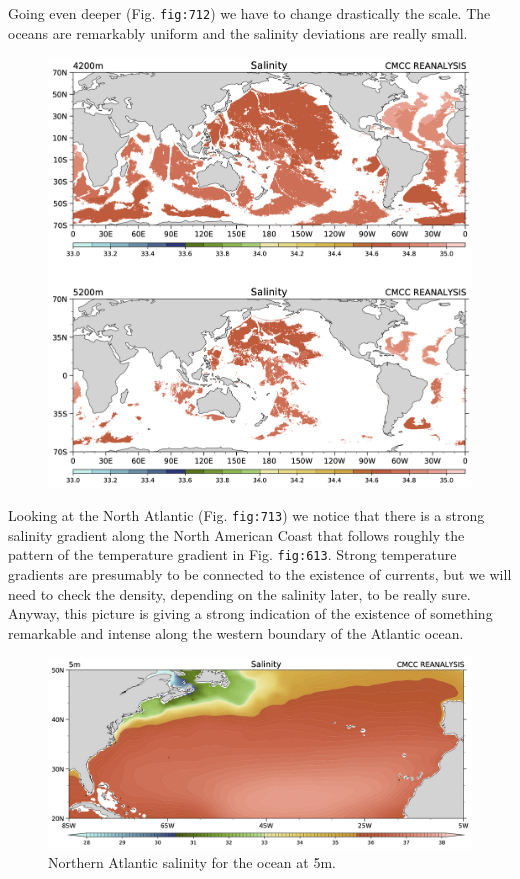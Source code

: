 Going even deeper (Fig. \texttt{fig:712}) we have to change drastically
the scale. The oceans are remarkably uniform and the salinity deviations
are really small.

\begin{figure}
\centering
\includegraphics[width = .7 \textwidth]{figs/GD/Sal4200-5200.png}
\caption{} \label{fig:}
\end{figure}

Looking at the North Atlantic (Fig. \texttt{fig:713}) we notice that
there is a strong salinity gradient along the North American Coast that
follows roughly the pattern of the temperature gradient in Fig.
\texttt{fig:613}. Strong temperature gradients are presumably to be
connected to the existence of currents, but we will need to check the
density, depending on the salinity later, to be really sure. Anyway,
this picture is giving a strong indication of the existence of something
remarkable and intense along the western boundary of the Atlantic ocean.

\begin{figure}
\centering
\includegraphics[width = .7 \textwidth]{figs/GD/SGulf5.png}
\caption{Northern Atlantic salinity for the ocean at 5m.}
\end{figure}

